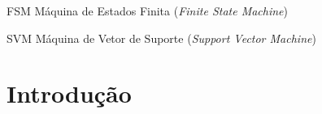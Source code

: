 \documentclass[
    12pt,       %
    oneside,    %
    a4paper,    %
%
    chapter=TITLE,	  	  %
%
    english,			  %
    brazil				  %
%
]{abntex2}
\begin{document}
\begin{siglas}
  \item[FSM] Máquina de Estados Finita (\textit{Finite State Machine})
  \item[SVM] Máquina de Vetor de Suporte (\textit{Support Vector Machine})
\end{siglas}


\tableofcontents*
\cleardoublepage{}



\textual{}
\chapter{Introdução}
\label{ch:introducao}


\end{document}
